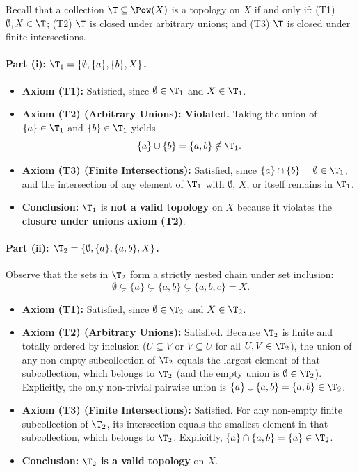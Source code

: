 
Recall that a collection $\T\subseteq\Pow(X)$ is a topology on $X$ if and only if:
(T1) $\emptyset,X\in\T$; (T2) $\T$ is closed under arbitrary unions; and (T3) $\T$ is closed
under finite intersections.

\paragraph{Part (i): $\T_1=\{\emptyset,\{a\},\{b\},X\}$.}
\begin{itemize}
  \item \textbf{Axiom (T1):} Satisfied, since $\emptyset\in\T_1$ and $X\in\T_1$.
  \item \textbf{Axiom (T2) (Arbitrary Unions): Violated.} Taking the union of $\{a\}\in\T_1$
        and $\{b\}\in\T_1$ yields
        \[ \{a\}\cup\{b\}=\{a,b\}\notin\T_1. \]
  \item \textbf{Axiom (T3) (Finite Intersections):} Satisfied, since
        $\{a\}\cap\{b\}=\emptyset\in\T_1$, and the intersection of any element of $\T_1$ with
        $\emptyset$, $X$, or itself remains in $\T_1$.
  \item \textbf{Conclusion:} $\T_1$ is \textbf{not a valid topology} on $X$ because it
        violates the \textbf{closure under unions axiom (T2)}.
\end{itemize}

\paragraph{Part (ii): $\T_2=\{\emptyset,\{a\},\{a,b\},X\}$.}
Observe that the sets in $\T_2$ form a strictly nested chain under set inclusion:
\[ \emptyset\subsetneq\{a\}\subsetneq\{a,b\}\subsetneq\{a,b,c\}=X. \]
\begin{itemize}
  \item \textbf{Axiom (T1):} Satisfied, since $\emptyset\in\T_2$ and $X\in\T_2$.
  \item \textbf{Axiom (T2) (Arbitrary Unions):} Satisfied. Because $\T_2$ is finite and
        totally ordered by inclusion ($U\subseteq V$ or $V\subseteq U$ for all
        $U,V\in\T_2$), the union of any non-empty subcollection of $\T_2$ equals the largest
        element of that subcollection, which belongs to $\T_2$ (and the empty union is
        $\emptyset\in\T_2$). Explicitly, the only non-trivial pairwise union is
        $\{a\}\cup\{a,b\}=\{a,b\}\in\T_2$.
  \item \textbf{Axiom (T3) (Finite Intersections):} Satisfied. For any non-empty finite
        subcollection of $\T_2$, its intersection equals the smallest element in that
        subcollection, which belongs to $\T_2$. Explicitly,
        $\{a\}\cap\{a,b\}=\{a\}\in\T_2$.
  \item \textbf{Conclusion:} $\T_2$ \textbf{is a valid topology} on $X$.
\end{itemize}

